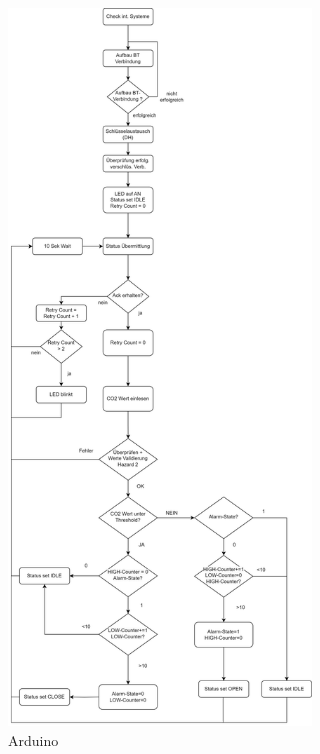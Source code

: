 \begin{figure}[h]
	\includegraphics[height=190mm,left]{images/ablaufdiag_adriuno.jpg}
	\centering
	\caption{Arduino}
	\label{fig:system}
\end{figure}